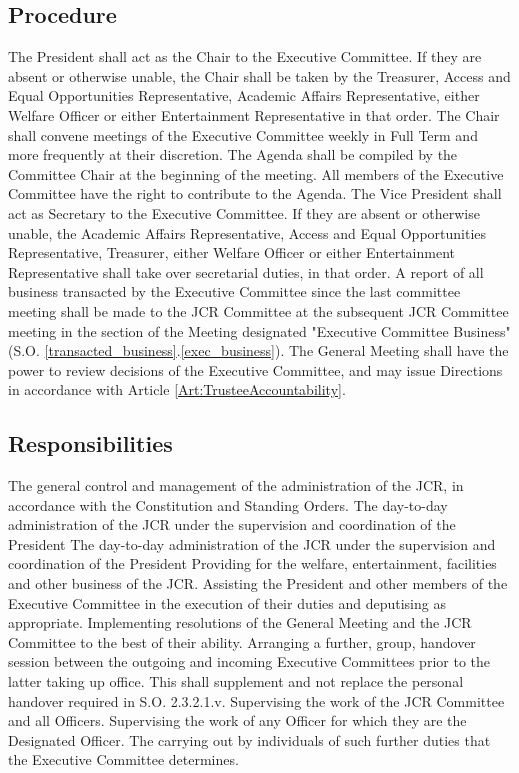 \subsection{Procedure}
\npara The President shall act as the Chair to the Executive Committee.
If they are absent or otherwise unable, the Chair shall be taken by the Treasurer, Access and Equal Opportunities Representative, Academic Affairs Representative, either Welfare Officer or either Entertainment Representative in that order.
\npara The Chair shall convene meetings of the Executive Committee weekly in Full Term and more frequently at their discretion.
\npara The Agenda shall be compiled by the Committee Chair at the beginning of the meeting.
All members of the Executive Committee have the right to contribute to the Agenda.
\npara The Vice President shall act as Secretary to the Executive Committee.
If they are absent or otherwise unable, the Academic Affairs Representative, Access and Equal Opportunities Representative, Treasurer, either Welfare Officer or either Entertainment Representative shall take over secretarial duties, in that order.
\npara A report of all business transacted by the Executive Committee since the last committee meeting shall be made to the JCR Committee at the subsequent JCR Committee meeting in the section of the Meeting designated "Executive Committee Business" (S.O. \ref{transacted_business}.\ref{exec_business}).
\npara The General Meeting shall have the power to review decisions of the Executive Committee, and may issue Directions in accordance with Article \ref{Art:TrusteeAccountability}.
\subsection{Responsibilities}
\npara The general control and management of the administration of the JCR, in accordance with the Constitution and Standing Orders.
\npara The day-to-day administration of the JCR under the supervision and coordination of the President
\npara The day-to-day administration of the JCR under the supervision and coordination of the President
\npara Providing for the welfare, entertainment, facilities and other business of the JCR.
\npara Assisting the President and other members of the Executive Committee in the execution of their duties and deputising as appropriate.
\npara Implementing resolutions of the General Meeting and the JCR Committee to the best of their ability.
\npara Arranging a further, group, handover session between the outgoing and incoming Executive Committees prior to the latter taking up office. This shall supplement and not replace the personal handover required in S.O. 2.3.2.1.v.
\npara Supervising the work of the JCR Committee and all Officers.
\npara Supervising the work of any Officer for which they are the Designated Officer.
\npara The carrying out by individuals of such further duties that the Executive Committee determines.
